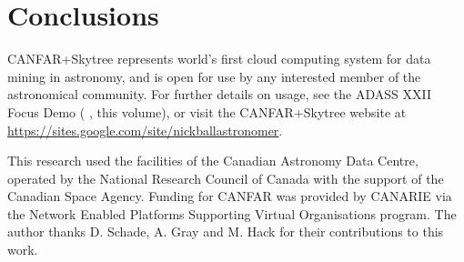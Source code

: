 \documentclass[11pt,twoside]{article}
\begin{document}
\section{Conclusions}

CANFAR+Skytree represents world's first cloud computing system for data mining in astronomy, and is open for use by any interested member of the astronomical community. For further details on usage, see the ADASS XXII Focus Demo (\citeauthor{ball:adass12focusdemo} \citeyear{ball:adass12focusdemo}, this volume), or visit the CANFAR+Skytree website at \url{https://sites.google.com/site/nickballastronomer}.

\acknowledgements This research used the facilities of the Canadian Astronomy Data Centre, operated by the National Research Council of Canada with the support of the Canadian Space Agency. Funding for CANFAR was provided by CANARIE via the Network Enabled Platforms Supporting Virtual Organisations program. The author thanks D. Schade, A. Gray and M. Hack for their contributions to this work.


\end{document}
